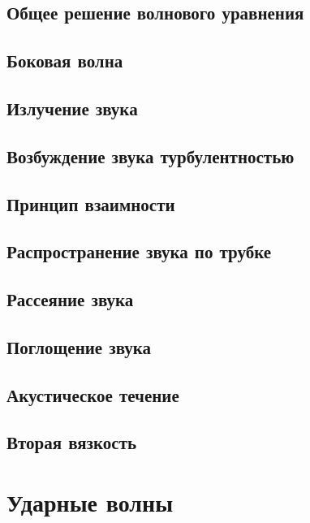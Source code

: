 \documentclass[12pt,a4paper]{book}
\begin{document}
\section{Общее решение волнового уравнения}\label{sec:p72}
\section{Боковая волна}\label{sec:p73}
\section{Излучение звука}\label{sec:p74}
\section{Возбуждение звука турбулентностью}\label{sec:p75}
\section{Принцип взаимности}\label{sec:p76}
\section{Распространение звука по трубке}\label{sec:p77}
\section{Рассеяние звука}\label{sec:p78}
\section{Поглощение звука}\label{sec:p79}
\section{Акустическое течение}\label{sec:p80}
\section{Вторая вязкость}\label{sec:p81}

\chapter{Ударные волны}
\end{document}
